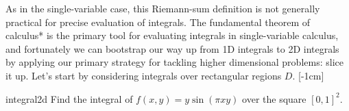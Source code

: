 \documentclass{watsonbook}
\begin{document}
  As in the single-variable case, this Riemann-sum definition is not
  generally practical for precise evaluation of integrals. The
  fundamental theorem of calculus* is the primary tool for evaluating
  integrals in single-variable calculus, and fortunately we can
  bootstrap our way up from 1D integrals to 2D integrals by applying
  our primary strategy for tackling higher dimensional problems: slice
  it up. Let's start by considering integrals over rectangular regions
  $D$. [-1cm]

  \begin{example}{}{integral2d}
    Find the integral of $f(x,y) = y \sin(\pi x y)$ over the square $[0,1]^2$. 
  \end{example}
\end{document}
